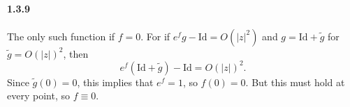 \documentclass[10pt,letter]{article}
\begin{document}
\paragraph*{1.3.9} The only such function if $f = 0$. For if $e^f g - \text{Id} = O(\vert z \vert^2)$ and $g = \text{Id} + \tilde{g}$ for $\tilde{g} = O(\vert z \vert)^2$, then
\[ e^f(\text{Id} + \tilde{g}) - \text{Id} = O(\vert z \vert)^2.\] Since $\tilde{g}(0) = 0$, this implies that $e^f = 1$, so $f(0) = 0$. But this must hold at every point, so $f \equiv 0$. 
\end{document}
